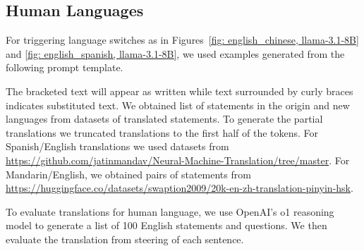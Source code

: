 \subsection{Human Languages} For triggering language switches as in Figures~\ref{fig: english_chinese, llama-3.1-8B} and \ref{fig: english_spanish, llama-3.1-8B}, we used examples generated from the following prompt template.

\begin{center}
\end{center}
The bracketed text will appear as written while text surrounded by curly braces indicates substituted text. We obtained list of statements in the origin and new languages from datasets of translated statements. To generate the partial translations we truncated translations to the first half of the tokens. For Spanish/English translations we used datasets from \url{https://github.com/jatinmandav/Neural-Machine-Translation/tree/master}. For Mandarin/English, we obtained pairs of statements from \url{https://huggingface.co/datasets/swaption2009/20k-en-zh-translation-pinyin-hsk}. 

To evaluate translations for human language, we use OpenAI's o1 reasoning model to generate a list of 100 English statements and questions. We then evaluate the translation from steering of each sentence.

